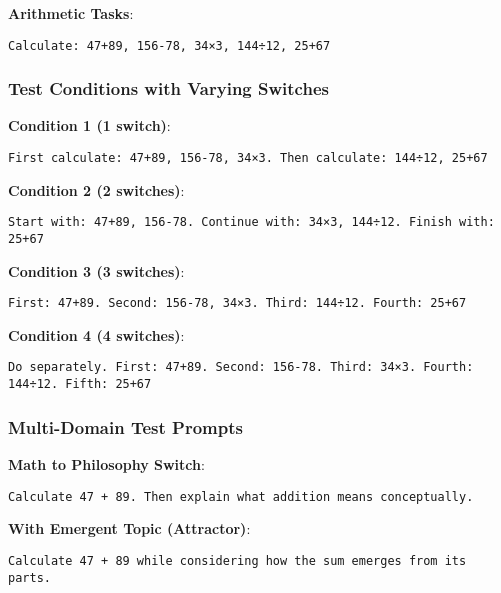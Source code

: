 \documentclass[
  11pt]{article}
\begin{document}
\textbf{Arithmetic Tasks}:

\begin{verbatim}
Calculate: 47+89, 156-78, 34×3, 144÷12, 25+67
\end{verbatim}

\subsubsection{Test Conditions with Varying
Switches}\label{test-conditions-with-varying-switches}

\textbf{Condition 1 (1 switch)}:

\begin{verbatim}
First calculate: 47+89, 156-78, 34×3. Then calculate: 144÷12, 25+67
\end{verbatim}

\textbf{Condition 2 (2 switches)}:

\begin{verbatim}
Start with: 47+89, 156-78. Continue with: 34×3, 144÷12. Finish with: 25+67
\end{verbatim}

\textbf{Condition 3 (3 switches)}:

\begin{verbatim}
First: 47+89. Second: 156-78, 34×3. Third: 144÷12. Fourth: 25+67
\end{verbatim}

\textbf{Condition 4 (4 switches)}:

\begin{verbatim}
Do separately. First: 47+89. Second: 156-78. Third: 34×3. Fourth: 144÷12. Fifth: 25+67
\end{verbatim}

\subsubsection{Multi-Domain Test
Prompts}\label{multi-domain-test-prompts}

\textbf{Math to Philosophy Switch}:

\begin{verbatim}
Calculate 47 + 89. Then explain what addition means conceptually.
\end{verbatim}

\textbf{With Emergent Topic (Attractor)}:

\begin{verbatim}
Calculate 47 + 89 while considering how the sum emerges from its parts.
\end{verbatim}
\end{document}
